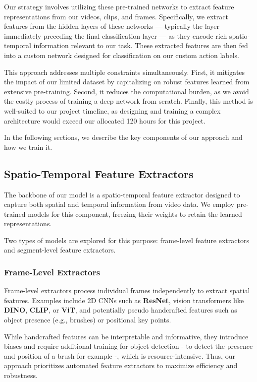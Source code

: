 Our strategy involves utilizing these pre-trained networks to extract feature representations from our videos, clips, and frames. Specifically, we extract features from the hidden layers of these networks — typically the layer immediately preceding the final classification layer — as they encode rich spatio-temporal information relevant to our task. These extracted features are then fed into a custom network designed for classification on our custom action labels.

This approach addresses multiple constraints simultaneously. First, it mitigates the impact of our limited dataset by capitalizing on robust features learned from extensive pre-training. Second, it reduces the computational burden, as we avoid the costly process of training a deep network from scratch. Finally, this method is well-suited to our project timeline, as designing and training a complex architecture would exceed our allocated 120 hours for this project.

In the following sections, we describe the key components of our approach and how we train it.

\subsection{Spatio-Temporal Feature Extractors}
The backbone of our model is a spatio-temporal feature extractor designed to capture both spatial and temporal information from video data. We employ pre-trained models for this component, freezing their weights to retain the learned representations.

Two types of models are explored for this purpose: frame-level feature extractors and segment-level feature extractors.

\subsubsection{Frame-Level Extractors}
Frame-level extractors process individual frames independently to extract spatial features. Examples include 2D CNNs such as \textbf{ResNet}, vision transformers like \textbf{DINO}, \textbf{CLIP}, or \textbf{ViT}, and potentially pseudo handcrafted features such as object presence (e.g., brushes) or positional key points.

While handcrafted features can be interpretable and informative, they introduce biases and require additional training for object detection - to detect the presence and position of a brush for example -, which is resource-intensive. Thus, our approach prioritizes automated feature extractors to maximize efficiency and robustness.

